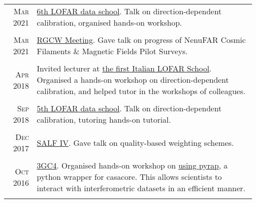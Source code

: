\documentclass[11pt,a4paper,notitlepage]{article}
\begin{document}
\begin{tabular}{r|p{12.5cm}}
	\textsc{Mar 2021} & \href{https://www.astron.nl/lofarschool2021/}{6th LOFAR data school}. Talk on direction-dependent calibration, organised hands-on workshop.\\
	\multicolumn{2}{c}{} \\
	
	\textsc{Mar 2021} & \href{https://sites.google.com/inaf.it/rgcw-meeting/home-page}{RGCW Meeting}. Gave talk on progress of NenuFAR Cosmic Filaments \& Magnetic Fields Pilot Surveys.\\
	\multicolumn{2}{c}{} \\
	
	\textsc{Apr 2018} & Invited lecturer at \href{https://indico.ced.inaf.it/event/9/}{the first Italian LOFAR School}. Organised a hands-on workshop on direction-dependent calibration, and helped tutor in the workshops of colleagues.\\
	\multicolumn{2}{c}{} \\
	
	\textsc{Sep 2018} & \href{https://www.astron.nl/lofarschool2018/}{5th LOFAR data school}. Talk on direction-dependent calibration, tutoring hands-on tutorial.\\
	\multicolumn{2}{c}{} \\
	
	\textsc{Dec 2017} & \href{http://www.physics.usyd.edu.au/salf_iv/}{SALF IV}. Gave talk on quality-based weighting schemes.\\
	\multicolumn{2}{c}{} \\
	
	\textsc{Oct 2016} & \href{http://www.ast.uct.ac.za/ast/meetings-workshops/3gc4}{3GC4}. Organised hands-on workshop on \href{https://github.com/ebonnassieux/Teaching/blob/master/PyrapTutorial.ipynb}{using pyrap}, a python wrapper for casacore. This allows scientists to interact with interferometric datasets in an efficient manner.\\
	\multicolumn{2}{c}{} \\
	
\end{tabular}







\end{document}
